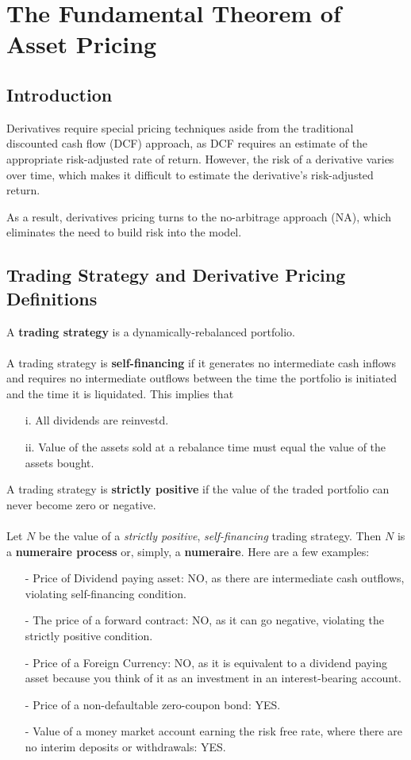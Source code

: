 \documentclass[12pt]{article}
\theoremstyle{plain}
\theoremstyle{definition}
\theoremstyle{remark}
\begin{document}
\section{The Fundamental Theorem of Asset Pricing}

\subsection{Introduction}

Derivatives require special pricing techniques aside from the traditional
discounted cash flow (DCF) approach, as DCF requires an estimate of the
appropriate risk-adjusted rate of return.  However, the risk of a 
derivative varies over time, which makes it difficult to estimate the
derivative's risk-adjusted return.

As a result, derivatives pricing turns to the no-arbitrage approach (NA),
which eliminates the need to build risk into the model.  

\subsection{Trading Strategy and Derivative Pricing Definitions}

A \textbf{trading strategy} is a dynamically-rebalanced portfolio.
\\
\\
A trading strategy is \textbf{self-financing} if it generates no 
intermediate cash inflows and requires no intermediate outflows between
the time the portfolio is initiated and the time it is liquidated.  This
implies that
   \begin{itemize}
      \item[i.]{All dividends are reinvestd.}
      \item[ii.]{Value of the assets sold at a rebalance time must 
	 equal the value of the assets bought.}
   \end{itemize}
A trading strategy is \textbf{strictly positive} if the value of the 
traded portfolio can never become zero or negative.
\\
\\ 
Let $N$ be the value of a \emph{strictly positive}, \emph{self-financing}
trading strategy.  Then $N$ is a \textbf{numeraire process} or, simply,
a \textbf{numeraire}. Here are a few examples:
\begin{itemize}
   \item[-]{Price of Dividend paying asset: 
	 NO, as there are intermediate 
	 cash outflows, violating self-financing condition.}
   \item[-]{The price of a forward contract: NO, as it can go negative,
      violating the strictly positive condition.}
   \item[-]{Price of a Foreign Currency: 
      NO, as it is equivalent to a dividend
      paying asset because you think of it as an investment in an
      interest-bearing account.}
   \item[-]{Price of a non-defaultable zero-coupon bond: YES.}
   \item[-]{Value of a money market account earning the risk free rate,
      where there are no interim deposits or withdrawals: YES.}
\end{itemize}
\end{document}
